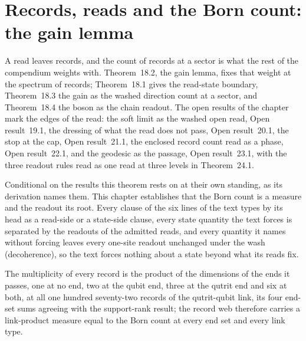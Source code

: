 \section{Records, reads and the Born count: the gain lemma}\label{mod:I-3-records-reads-and-the-born-count-the-gain-lemma}
\label{narr:open:1-3}A read leaves records, and the count of records at a sector is what the rest of the compendium weights with. Theorem~18.2, the gain lemma, fixes that weight at the spectrum of records; Theorem~18.1 gives the read-state boundary, Theorem~18.3 the gain as the washed direction count at a sector, and Theorem~18.4 the boson as the chain readout. The open results of the chapter mark the edges of the read: the soft limit as the washed open read, Open result~19.1, the dressing of what the read does not pass, Open result~20.1, the stop at the cap, Open result~21.1, the enclosed record count read as a phase, Open result~22.1, and the geodesic as the passage, Open result~23.1, with the three readout rules read as one read at three levels in Theorem~24.1.
\begin{chconditional}\label{box:I-3-records-reads-and-the-born-count-the-gain-lemma:1}
Conditional on the results this theorem rests on at their own standing, as its derivation names them.
This chapter establishes that the Born count is a measure and the readout its root. Every clause of the six lines of the text types by its head as a read-side or a state-side clause, every state quantity the text forces is separated by the readouts of the admitted reads, and every quantity it names without forcing leaves every one-site readout unchanged under the wash (decoherence), so the text forces nothing about a state beyond what its reads fix.
\end{chconditional}
\begin{chtheorem}\label{box:I-3-records-reads-and-the-born-count-the-gain-lemma:2}
The multiplicity of every record is the product of the dimensions of the ends it passes, one at no end, two at the qubit end, three at the qutrit end and six at both, at all one hundred seventy-two records of the qutrit-qubit link, its four end-set sums agreeing with the support-rank result; the record web therefore carries a link-product measure equal to the Born count at every end set and every link type.
\end{chtheorem}

